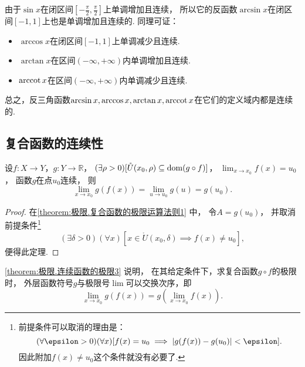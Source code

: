 \begin{example}
由于\(\sin x\)在闭区间\(\left[-\frac{\pi}{2},\frac{\pi}{2}\right]\)上单调增加且连续，
所以它的反函数\(\arcsin x\)在闭区间\([-1,1]\)上也是单调增加且连续的.
同理可证：
\begin{itemize}
	\item \(\arccos x\)在闭区间\([-1,1]\)上单调减少且连续.
	\item \(\arctan x\)在区间\((-\infty,+\infty)\)内单调增加且连续.
	\item \(\arccot x\)在区间\((-\infty,+\infty)\)内单调减少且连续.
\end{itemize}
总之，反三角函数\(\arcsin x,\arccos x,\arctan x,\arccot x\)在它们的定义域内都是连续的.
\end{example}

\subsection{复合函数的连续性}
\begin{theorem}\label{theorem:极限.连续函数的极限3}
设\(f\colon X \to Y\)，\(g\colon Y\to\mathbb{R}\)，
\((\exists\rho>0)[\mathring{U}(x_0,\rho) \subseteq \operatorname{dom}(g \circ f)]\)，
\(\lim_{x \to x_0} f(x) = u_0\)，
函数\(g\)在点\(u_0\)连续，
则\begin{equation*}
	\lim_{x \to x_0} g(f(x))
	= \lim_{u \to u_0} g(u)
	= g(u_0).
\end{equation*}
\begin{proof}
在\cref{theorem:极限.复合函数的极限运算法则1} 中，
令\(A = g(u_0)\)，
并取消前提条件\footnote{前提条件可以取消的理由是：\begin{equation*}
	(\forall\epsilon>0)
	(\forall x)
	[
		f(x) = u_0
		\implies
		\abs{g(f(x)) - g(u_0)} < \epsilon
	].
\end{equation*}
因此附加\(f(x) \neq u_0\)这个条件就没有必要了.}\begin{equation*}
	(\exists\delta>0)(\forall x)[x\in\mathring{U}(x_0,\delta) \implies f(x)\neq u_0],
\end{equation*}
便得此定理.
\end{proof}
\end{theorem}
\begin{remark}
\cref{theorem:极限.连续函数的极限3} 说明，
在其给定条件下，求复合函数\(g \circ f\)的极限时，
外层函数符号\(g\)与极限号\(\lim\)可以交换次序，即\begin{equation*}
	\lim_{x \to x_0} g(f(x))
	= g\left(\lim_{x \to x_0} f(x)\right).
\end{equation*}
\end{remark}


